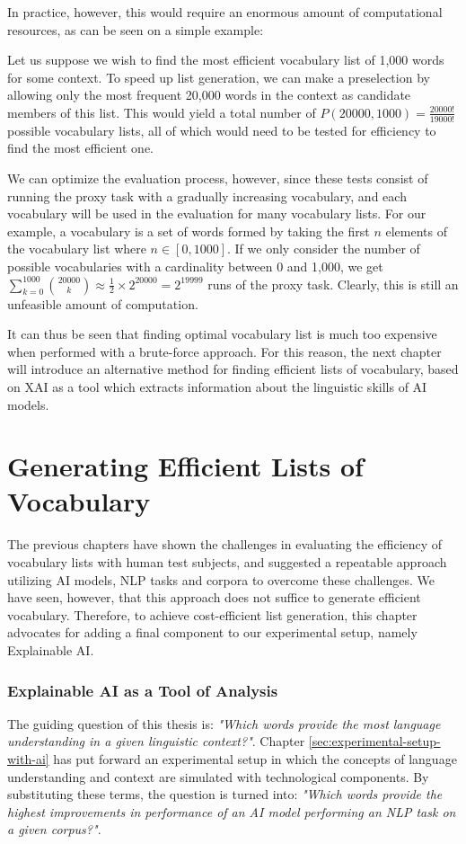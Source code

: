 In practice, however, this would require an enormous amount of computational resources, as can be seen on a simple example:

Let us suppose we wish to find the most efficient vocabulary list of 1,000 words for some context.
To speed up list generation, we can make a preselection by allowing only the most frequent 20,000 words in the context as candidate members of this list.
This would yield a total number of $P(20000, 1000) = \frac{20000!}{19000!}$ possible vocabulary lists, all of which would need to be tested for efficiency to find the most efficient one.

We can optimize the evaluation process, however, since these tests consist of running the proxy task with a gradually increasing vocabulary, and each vocabulary will be used in the evaluation for many vocabulary lists.
For our example, a vocabulary is a set of words formed by taking the first $n$ elements of the vocabulary list where $n \in [0, 1000]$.
If we only consider the number of possible vocabularies with a cardinality between 0 and 1,000, we get
$
	\sum_{k=0}^{1000} \binom{20000}{k} \approx \frac{1}{2} \times 2^{20000} = 2^{19999}
$ runs of the proxy task. Clearly, this is still an unfeasible amount of computation.

It can thus be seen that finding optimal vocabulary list is much too expensive when performed with a brute-force approach.
For this reason, the next chapter will introduce an alternative method for finding efficient lists of vocabulary, based on XAI as a tool which extracts information about the linguistic skills of AI models.

\section{Generating Efficient Lists of Vocabulary} \label{sec:list-generation}

The previous chapters have shown the challenges in evaluating the efficiency of vocabulary lists with human test subjects, and suggested a repeatable approach utilizing AI models, NLP tasks and corpora to overcome these challenges.
We have seen, however, that this approach does not suffice to generate efficient vocabulary.
Therefore, to achieve cost-efficient list generation, this chapter advocates for adding a final component to our experimental setup, namely Explainable AI.

\subsubsection{Explainable AI as a Tool of Analysis} \label{sec:xai-as-tools-of-analysis}
The guiding question of this thesis is:
\textit{"Which words provide the most language understanding in a given linguistic context?"}.
Chapter \ref{sec:experimental-setup-with-ai} has put forward an experimental setup in which the concepts of language understanding and context are simulated with technological components.
By substituting these terms, the question is turned into:
\textit{"Which words provide the highest improvements in performance of an AI model performing an NLP task on a given corpus?"}.

